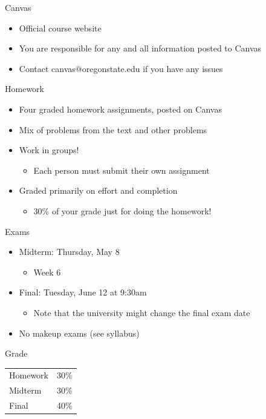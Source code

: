 \documentclass[10pt]{beamer}
\begin{document}
\begin{frame}[label={sec:orgdd36081}]{}
\alert{Canvas}
\begin{itemize}
\item Official course website
\item You are responsible for any and all information posted to Canvas
\item Contact canvas@oregonstate.edu if you have any issues
\end{itemize}
\end{frame}

\begin{frame}[label={sec:org9c8c708}]{}
\alert{Homework}
\begin{itemize}
\item Four graded homework assignments, posted on Canvas
\item Mix of problems from the text and other problems
\item Work in groups!
\begin{itemize}
\item Each person must submit their own assignment
\end{itemize}
\item Graded primarily on effort and completion
\begin{itemize}
\item 30\% of your grade just for doing the homework!
\end{itemize}
\end{itemize}
\end{frame}

\begin{frame}[label={sec:orgb5bd326}]{}
\alert{Exams}
\begin{itemize}
\item Midterm: Thursday, May 8 
\begin{itemize}
\item Week 6
\end{itemize}
\item Final: Tuesday, June 12 at 9:30am 
\begin{itemize}
\item Note that the university might change the final exam date
\end{itemize}
\item No makeup exams (see syllabus)
\end{itemize}
\end{frame}

\begin{frame}[label={sec:org06fc7f1}]{}
\alert{Grade}
\begin{center}
\begin{tabular}{ll}
Homework & 30\%\\
Midterm & 30\%\\
Final & 40\%\\
\end{tabular}
\end{center}
\end{frame}
\end{document}
